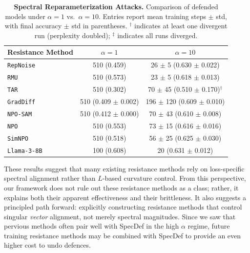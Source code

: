 \documentclass{article}
\theoremstyle{plain}
\theoremstyle{definition}
\theoremstyle{remark}
\begin{document}
\begin{table}[htbp]
\centering
\caption{
\textbf{Spectral Reparameterization Attacks.} Comparison of defended models under $\alpha=1$ vs.\ $\alpha=10$.
Entries report mean training steps $\pm$ std, with final accuracy $\pm$ std in parentheses.
$^{\dagger}$ indicates at least one divergent run (perplexity doubled);
$^{\ddagger}$ indicates all runs diverged.
}
\label{tab:defence-sigma-comparison}
\begin{sc}
\begin{tabular}{lcc}
\toprule
Resistance Method & $\alpha=1$ & $\alpha=10$ \\
\midrule
\texttt{RepNoise} & 510 (0.459) & 26 $\pm$ 5 (0.630 $\pm$ 0.022) \\
\texttt{RMU} & 510 (0.573) & 23 $\pm$ 5 (0.618 $\pm$ 0.013) \\
\texttt{TAR} & 510 (0.302) & 70 $\pm$ 45 (0.510 $\pm$ 0.170)$^{\dagger}$ \\
\texttt{GradDiff} & 510 (0.409 $\pm$ 0.002) & 196 $\pm$ 120 (0.609 $\pm$ 0.010) \\
\texttt{NPO-SAM} & 510 (0.412 $\pm$ 0.000) & 70 $\pm$ 43 (0.610 $\pm$ 0.008) \\
\texttt{NPO} & 510 (0.553) & 73 $\pm$ 15 (0.616 $\pm$ 0.016) \\
\texttt{SimNPO} & 510 (0.518) & 56 $\pm$ 25 (0.625 $\pm$ 0.030) \\
\texttt{Llama-3-8B} & 100 (0.608) & 20 (0.631 $\pm$ 0.012) \\
\bottomrule
\end{tabular}
\end{sc}
\end{table}

These results suggest that many existing resistance methods rely on loss-specific spectral alignment rather than $L$-based curvature control. From this perspective, our framework does not rule out these resistance methods as a class; rather, it explains both their apparent effectiveness and their brittleness. It also suggests a principled path forward: explicitly constructing resistance methods that control singular \emph{vector} alignment, not merely spectral magnitudes. Since we saw that pervious methods often pair well with SpecDef in the high $\alpha$ regime, future training resistance methods may be combined with SpecDef to provide an even higher cost to undo defences.
\end{document}
